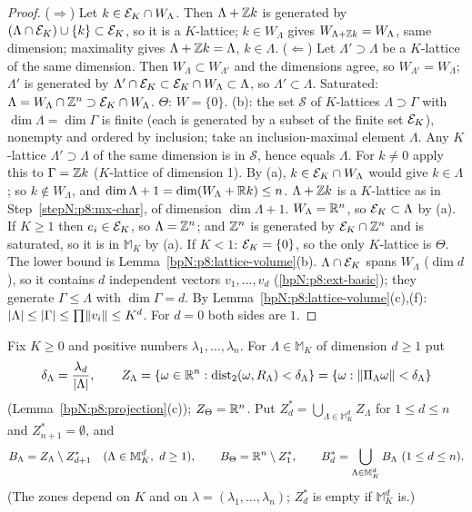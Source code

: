 \begin{proof}
\label{stepN:p8:mx-char} ($\Rightarrow$) Let $k\in\mathcal E_K\cap W_\Lambda$. Then $\Lambda+\mathbb{Z} k$ is generated by $(\Lambda\cap\mathcal E_K)\cup\{k\}\subset\mathcal E_K$, so it is a $K$-lattice; $k\in W_\Lambda$ gives $W_{\Lambda+\mathbb{Z} k}=W_\Lambda$, same dimension; maximality gives $\Lambda+\mathbb{Z} k=\Lambda$, $k\in\Lambda$. ($\Leftarrow$) Let $\Lambda'\supset\Lambda$ be a $K$-lattice of the same dimension. Then $W_\Lambda\subset W_{\Lambda'}$ and the dimensions agree, so $W_{\Lambda'}=W_\Lambda$; $\Lambda'$ is generated by $\Lambda'\cap\mathcal E_K\subset\mathcal E_K\cap W_\Lambda\subset\Lambda$, so $\Lambda'\subset\Lambda$. Saturated: $\Lambda=W_\Lambda\cap\mathbb{Z}^n\supset\mathcal E_K\cap W_\Lambda$. $\Theta$: $W=\{0\}$.
\label{stepN:p8:mx-exist} (b): the set $\mathcal S$ of $K$-lattices $\Lambda\supset\Gamma$ with $\dim\Lambda=\dim\Gamma$ is finite (each is generated by a subset of the finite set $\mathcal E_K$), nonempty and ordered by inclusion; take an inclusion-maximal element $\Lambda$. Any $K$-lattice $\Lambda'\supset\Lambda$ of the same dimension is in $\mathcal S$, hence equals $\Lambda$. For $k\ne0$ apply this to $\Gamma=\mathbb{Z} k$ ($K$-lattice of dimension 1).
\label{stepN:p8:mx-c} By (a), $k\in\mathcal E_K\cap W_\Lambda$ would give $k\in\Lambda$; so $k\notin W_\Lambda$, and $\dim\Lambda+1=\dim(W_\Lambda+\mathbb{R} k)\le n$. $\Lambda+\mathbb{Z} k$ is a $K$-lattice as in Step~\ref{stepN:p8:mx-char}, of dimension $\dim\Lambda+1$.
\label{stepN:p8:mx-d} $W_\Lambda=\mathbb{R}^n$, so $\mathcal E_K\subset\Lambda$ by (a). If $K\ge1$ then $e_i\in\mathcal E_K$, so $\Lambda=\mathbb{Z}^n$; and $\mathbb{Z}^n$ is generated by $\mathcal E_K\cap\mathbb{Z}^n$ and is saturated, so it is in $\mathbb M_K$ by (a). If $K<1$: $\mathcal E_K=\{0\}$, so the only $K$-lattice is $\Theta$.
\label{stepN:p8:mx-e} The lower bound is Lemma~\ref{bpN:p8:lattice-volume}(b). $\Lambda\cap\mathcal E_K$ spans $W_\Lambda$ ($\dim d$), so it contains $d$ independent vectors $v_1,\dots,v_d$ (\ref{bpN:p8:ext-basic}); they generate $\Gamma\le\Lambda$ with $\dim\Gamma=d$. By Lemma~\ref{bpN:p8:lattice-volume}(c),(f): $\lvert \Lambda\rvert\le\lvert \Gamma\rvert\le\prod\lVert v_i\rVert\le K^d$. For $d=0$ both sides are $1$.
\end{proof}

\begin{definition}\label{bpN:p8:blocks}
Fix $K\ge0$ and positive numbers $\lambda_1,\dots,\lambda_n$. For $\Lambda\in\mathbb M_K$ of dimension $d\ge1$ put
\[\delta_\Lambda=\frac{\lambda_d}{\lvert \Lambda\rvert},\qquad Z_\Lambda=\{\omega\in\mathbb{R}^n:\operatorname{dist}_2(\omega,R_\Lambda)<\delta_\Lambda\}=\{\omega:\lVert \Pi_\Lambda\omega\rVert<\delta_\Lambda\}\]
(Lemma~\ref{bpN:p8:projection}(c)); $Z_\Theta=\mathbb{R}^n$. Put $Z_d^*=\bigcup_{\Lambda\in\mathbb M_K^d}Z_\Lambda$ for $1\le d\le n$ and $Z^*_{n+1}=\emptyset$, and
\[B_\Lambda=Z_\Lambda\setminus Z^*_{d+1}\quad(\Lambda\in\mathbb M_K^d,\ d\ge1),\qquad B_\Theta=\mathbb{R}^n\setminus Z_1^*,\qquad B_d^*=\bigcup_{\Lambda\in\mathbb M_K^d}B_\Lambda\ (1\le d\le n).\]
(The zones depend on $K$ and on $\lambda=(\lambda_1,\dots,\lambda_n)$; $Z^*_d$ is empty if $\mathbb M_K^d$ is.)
\end{definition}

